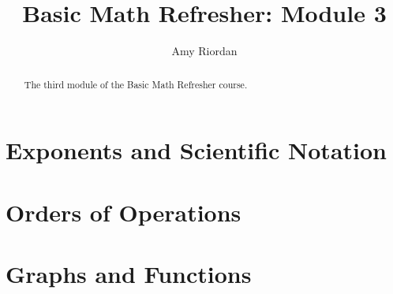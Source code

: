 \documentclass{xourse}
\title{Basic Math Refresher: Module 3}
\author{Amy Riordan}
\begin{document}
\begin{abstract}
    The third module of the Basic Math Refresher course.
\end{abstract}
\maketitle

\part{Exponents and Scientific Notation}


\part{Orders of Operations}


\part{Graphs and Functions}

\end{document}
